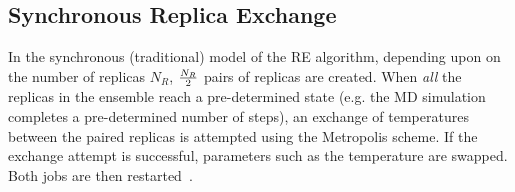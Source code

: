 \documentclass{rspublic}
\newcommand{\jhanote}[1]{ {\textcolor{red} { ***shantenu: #1 }}}
\newcommand{\alnote}[1]{ {\textcolor{blue} { ***andre: #1 }}}
\newcommand{\athotanote}[1]{ {\textcolor{green} { ***athota: #1 }}}
\newcommand{\alnote}[1]{}
\newcommand{\athotanote}[1]{}
\newcommand{\jhanote}[1]{}
\begin{document}



\subsection{Synchronous Replica Exchange}

  In the synchronous (traditional)
model of the RE algorithm, depending upon on the number of replicas ${N_R}$, 
${N_R \over 2}$ pairs of replicas are created. When \emph{all} the replicas in the ensemble reach a
pre-determined state (e.g. the MD simulation completes a pre-determined
number of steps), %
an exchange of temperatures between the paired replicas is attempted
using the Metropolis scheme. %
If the exchange attempt is successful, parameters such as the
temperature are swapped. Both jobs are then
restarted~\citep{Luckow:2008fp}.



\end{document}
